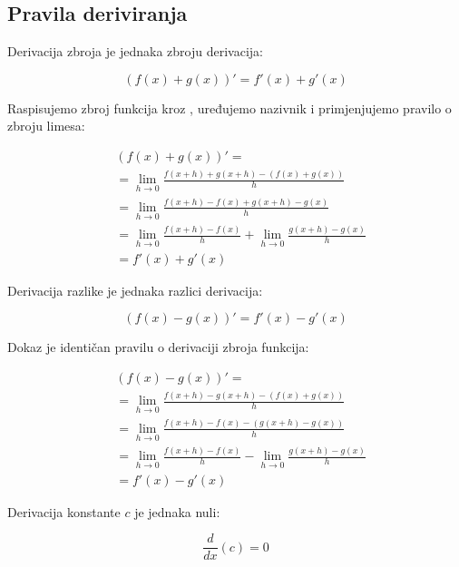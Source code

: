 \subsection{Pravila deriviranja}

\begin{multicols}{2}

\begin{proposition}
    Derivacija zbroja je jednaka zbroju derivacija:

    $$
        (f(x)+g(x))' = f'(x) + g'(x)
    $$
\end{proposition}

Raspisujemo zbroj funkcija kroz ,
uređujemo nazivnik i primjenjujemo pravilo o zbroju limesa:

\begin{align*}
    &(f(x)+g(x))'=\\
    &=\lim_{h\to 0}\frac{f(x+h)+g(x+h)-(f(x)+g(x))}{h}\\
    &=\lim_{h\to 0}\frac{f(x+h)-f(x)+g(x+h)-g(x)}{h}\\
    &=\lim_{h\to 0}\frac{f(x+h)-f(x)}{h} + \lim_{h\to 0}\frac{g(x+h)-g(x)}{h}\\
    &=f'(x) + g'(x)
\end{align*}

\begin{proposition}
    Derivacija razlike je jednaka razlici derivacija:

    $$
        (f(x)-g(x))' = f'(x) - g'(x)
    $$
\end{proposition}

Dokaz je identičan pravilu o derivaciji zbroja funkcija:

\begin{align*}
    &(f(x)-g(x))'=\\
    &=\lim_{h\to 0}\frac{f(x+h)-g(x+h)-(f(x)+g(x))}{h}\\
    &=\lim_{h\to 0}\frac{f(x+h)-f(x)-(g(x+h)-g(x))}{h}\\
    &=\lim_{h\to 0}\frac{f(x+h)-f(x)}{h} - \lim_{h\to 0}\frac{g(x+h)-g(x)}{h}\\
    &=f'(x) - g'(x)
\end{align*}

\begin{proposition}
    Derivacija konstante $c$ je jednaka nuli:

    $$
        \frac{d}{dx}(c) = 0
    $$
\end{proposition}


\end{multicols}

